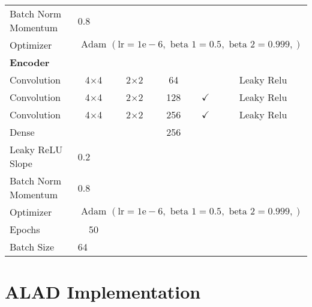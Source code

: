 \begin{longtable}[c]{@{}lccccc@{}}
	Batch Norm Momentum & \multicolumn{5}{l}{0.8} \\
	Optimizer & \multicolumn{5}{l}{$\text { Adam }(\mathrm{lr}=1 \mathrm{e}-6, \text { beta } 1=0.5, \text { beta } 2=0.999,)$} \\ \hline
	\multicolumn{6}{l}{\textbf{Encoder}} \\
	Convolution & \multicolumn{1}{c}{4$\times$4} & 2$\times$2 & 64 &  & Leaky Relu \\
	Convolution & \multicolumn{1}{c}{4$\times$4} & 2$\times$2 & 128 & $\checkmark$ & Leaky Relu \\
	Convolution & \multicolumn{1}{c}{4$\times$4} & 2$\times$2 & 256 & $\checkmark$ & Leaky Relu \\
	Dense & \multicolumn{1}{c}{} &  & 256 &  &  \\ \hline
	Leaky ReLU Slope & \multicolumn{5}{l}{0.2} \\
	Batch Norm Momentum & \multicolumn{5}{l}{0.8} \\
	Optimizer & \multicolumn{5}{l}{$\text { Adam }(\mathrm{lr}=1 \mathrm{e}-6, \text { beta } 1=0.5, \text { beta } 2=0.999,)$} \\ \hline
	Epochs & 50 & \multicolumn{1}{l}{} & \multicolumn{1}{l}{} & \multicolumn{1}{l}{} & \multicolumn{1}{l}{} \\
	Batch Size & \multicolumn{5}{l}{64}
	
\end{longtable}


\section{ALAD Implementation}


